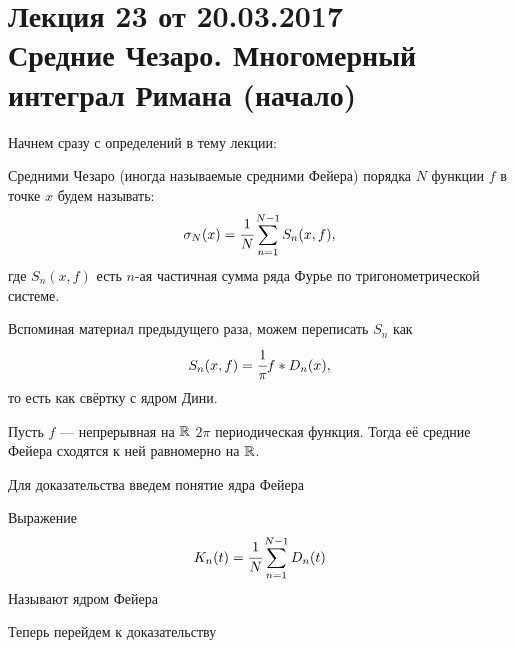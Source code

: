 \pagestyle{fancy}
\section{Лекция 23 от 20.03.2017 \\ Средние Чезаро. Многомерный интеграл Римана (начало)}
	Начнем сразу с определений в тему лекции:
	\begin{Def}
		Средними Чезаро (иногда называемые средними Фейера) порядка $N$ функции $f$ в точке $x$ будем называть:
		$$
			\sigma_N(x) = \cfrac{1}{N} \sum\limits_{n =1}^{N -1}S_n(x,f),
		$$
		 где $S_n(x,f)$ есть $n$-ая частичная сумма ряда Фурье по тригонометрической системе.
	\end{Def}
	Вспоминая материал предыдущего раза, можем переписать $S_n$ как
	$$
		S_n(x,f) = \cfrac{1}{\pi} f*D_n(x),
	$$
	 то есть как свёртку с ядром Дини.
	\begin{Theorem}
		Пусть $f$ --- непрерывная на $\mathbb{R}$ $2\pi$ периодическая функция. Тогда её средние Фейера сходятся к ней равномерно на $\mathbb{R}$. 
	\end{Theorem}
	Для доказательства введем понятие ядра Фейера
	\begin{Def}
		Выражение
		$$
			K_n(t) = \cfrac{1}{N}\sum\limits_{n=1}^{N-1}D_n(t)
		$$
		Называют ядром Фейера
	\end{Def}
	Теперь перейдем к доказательству
